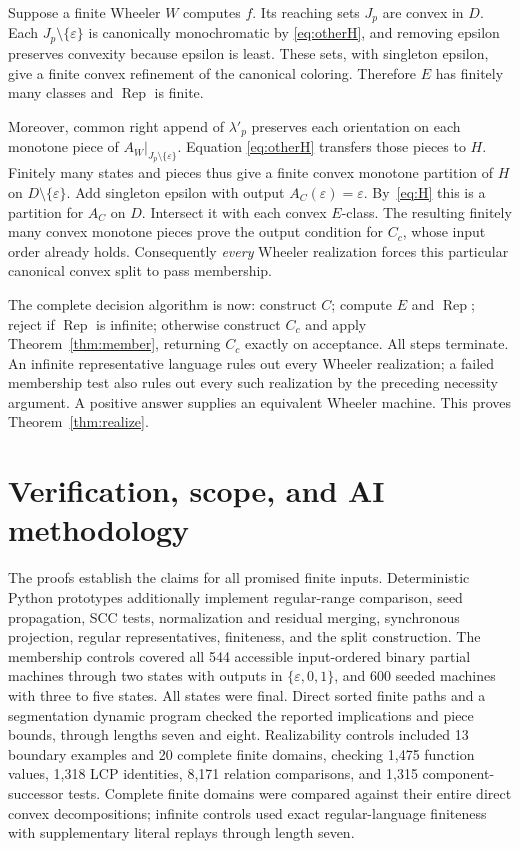 \documentclass[acmsmall,screen,nonacm,11pt]{acmart}
\newcommand{\eps}{\varepsilon}
\newcommand{\Rep}{\operatorname{Rep}}
\theoremstyle{definition}
\begin{document}
Suppose a finite Wheeler $W$ computes $f$. Its reaching sets $J_p$ are
convex in $D$. Each $J_p\setminus\{\eps\}$ is canonically monochromatic by
\eqref{eq:otherH}, and removing epsilon preserves convexity because epsilon
is least. These sets, with singleton epsilon, give a finite convex
refinement of the canonical coloring. Therefore $E$ has finitely many
classes and $\Rep$ is finite.

Moreover, common right append of $\lambda'_p$ preserves each orientation
on each monotone piece of $A_W|_{J_p\setminus\{\eps\}}$. Equation
\eqref{eq:otherH} transfers those pieces to $H$. Finitely many states and
pieces thus give a finite convex monotone partition of $H$ on
$D\setminus\{\eps\}$. Add singleton epsilon with output $A_C(\eps)=\eps$.
By~\eqref{eq:H} this is a partition for $A_C$ on $D$. Intersect it with
each convex $E$-class. The resulting finitely many convex monotone pieces
prove the output condition for $C_c$, whose input order already holds.
Consequently \emph{every} Wheeler realization forces this particular
canonical convex split to pass membership.

The complete decision algorithm is now: construct $C$; compute $E$ and
$\Rep$; reject if $\Rep$ is infinite; otherwise construct $C_c$ and apply
Theorem~\ref{thm:member}, returning $C_c$ exactly on acceptance. All steps
terminate. An infinite representative language rules out every Wheeler
realization; a failed membership test also rules out every such realization
by the preceding necessity argument. A positive answer supplies an
equivalent Wheeler machine. This proves Theorem~\ref{thm:realize}.

\section{Verification, scope, and AI methodology}

The proofs establish the claims for all promised finite inputs. Deterministic
Python prototypes additionally implement regular-range comparison, seed
propagation, SCC tests, normalization and residual merging, synchronous
projection, regular representatives, finiteness, and the split construction.
The membership controls covered all 544 accessible input-ordered binary
partial machines through two states with outputs in $\{\eps,0,1\}$, and
600 seeded machines with three to five states. All states were final.
Direct sorted finite paths and a segmentation dynamic program checked the
reported implications and piece bounds, through lengths seven and eight.
Realizability controls included 13 boundary examples and 20 complete finite
domains, checking 1,475 function values, 1,318 LCP identities, 8,171 relation
comparisons, and 1,315 component-successor tests. Complete finite domains
were compared against their entire direct convex decompositions; infinite
controls used exact regular-language finiteness with supplementary literal
replays through length seven.
\end{document}
